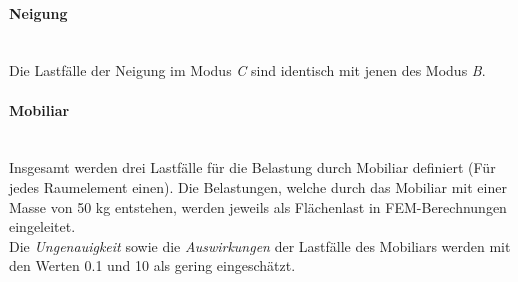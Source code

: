 \paragraph{Neigung}\mbox{}\\
Die Lastfälle der Neigung im Modus \emph{C} sind identisch mit jenen des Modus \emph{B}.

\paragraph{Mobiliar}\mbox{}\\
Insgesamt werden drei Lastfälle für die Belastung durch Mobiliar definiert (Für jedes Raumelement einen). Die Belastungen, welche durch das Mobiliar mit einer Masse von 50 kg entstehen, werden jeweils als Flächenlast in FEM-Berechnungen eingeleitet.\\
Die \emph{Ungenauigkeit} sowie die \emph{Auswirkungen} der Lastfälle des Mobiliars werden mit den Werten 0.1 und 10 als gering eingeschätzt.


